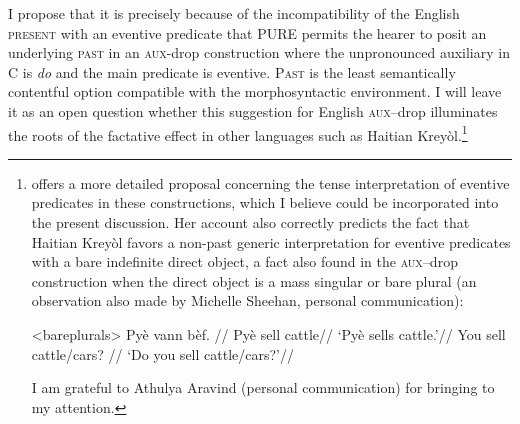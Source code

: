 \documentclass[output=paper]{langscibook}
\begin{document}
\noindent I propose that it is precisely because of the incompatibility of the English \textsc{present} with an eventive predicate that PURE permits the hearer to posit an underlying \textsc{past }in an \textsc{aux-}drop construction where the unpronounced auxiliary in C is \textit{do} and the main predicate is eventive. \textsc{Past} is the\textsc{ }least semantically contentful option compatible with the morphosyntactic environment. I will leave it as an open question whether this suggestion for English \textsc{aux}--drop illuminates the roots of the factative effect in other languages such as Haitian Kreyòl.\footnote{\citet{Dechaine:1995} offers a more detailed proposal concerning the tense interpretation of eventive predicates in these constructions, which I believe could be incorporated into the present discussion. Her account also correctly predicts the fact that Haitian Kreyòl favors a non-past generic interpretation for eventive predicates with a bare indefinite direct object, a fact also found in the \textsc{aux}--drop construction when the direct object is a mass singular or bare plural (an observation also made by Michelle Sheehan, personal communication):

\smallbreak
\pexcnn<bareplurals>
\a
\begingl
\gla Pyè vann bèf. {}//
\glb Pyè sell cattle//
\glft `Pyè sells cattle.'//
\endgl
\a
\begingl
\gla You sell cattle/cars? //
\glft `Do you sell cattle/cars?'//
\endgl
\xe
\smallbreak

\noindent I am grateful to Athulya Aravind (personal communication) for bringing \citet{Dechaine:1995} to my attention.}
\end{document}
